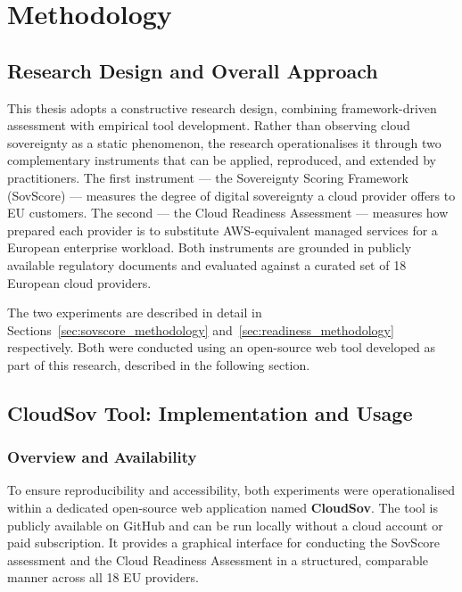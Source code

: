 \chapter{Methodology}
\label{ch:methodology}

\section{Research Design and Overall Approach}
\label{sec:research_design}

This thesis adopts a constructive research design, combining framework-driven assessment with empirical tool development. Rather than observing cloud sovereignty as a static phenomenon, the research operationalises it through two complementary instruments that can be applied, reproduced, and extended by practitioners. The first instrument — the Sovereignty Scoring Framework (SovScore) — measures the degree of digital sovereignty a cloud provider offers to EU customers. The second — the Cloud Readiness Assessment — measures how prepared each provider is to substitute AWS-equivalent managed services for a European enterprise workload. Both instruments are grounded in publicly available regulatory documents and evaluated against a curated set of 18 European cloud providers.

The two experiments are described in detail in Sections~\ref{sec:sovscore_methodology} and~\ref{sec:readiness_methodology} respectively. Both were conducted using an open-source web tool developed as part of this research, described in the following section.


\section{CloudSov Tool: Implementation and Usage}
\label{sec:cloudsov_tool}

\subsection{Overview and Availability}

To ensure reproducibility and accessibility, both experiments were operationalised within a dedicated open-source web application named \textbf{CloudSov}. The tool is publicly available on GitHub and can be run locally without a cloud account or paid subscription. It provides a graphical interface for conducting the SovScore assessment and the Cloud Readiness Assessment in a structured, comparable manner across all 18 EU providers.

